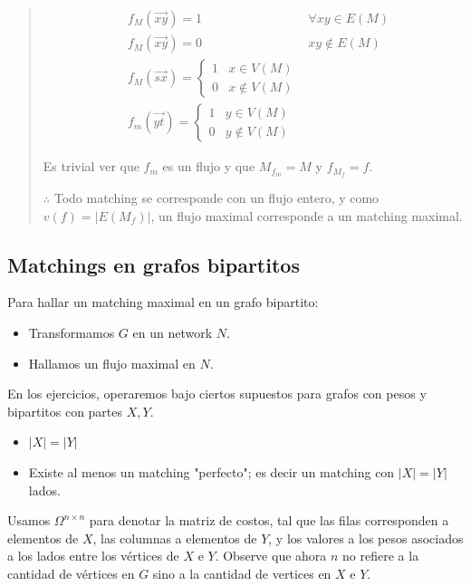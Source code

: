 \documentclass[a4paper]{article}
\begin{document}
\begin{quote}
\begin{align*}
    &f_M(\overrightarrow{xy}) = 1 & \forall xy \in  E(M) \\ 
    &f_M(\overrightarrow{xy}) = 0 & xy \not\in E(M) \\ 
    &f_M(\overrightarrow{sx}) = \begin{cases}
        1 & x \in V(M) \\ 
        0 & x \not\in V(M)
    \end{cases} \\ 
    &f_m(\overrightarrow{yt}) = \begin{cases}
        1 & y \in V(M) \\ 
        0 & y \not\in V(M)
    \end{cases}
\end{align*}

Es trivial ver que $f_m$ es un flujo y que $M_{f_m} = M$ y $f_{M_f} = f$.

$\therefore $ Todo matching se corresponde con un flujo entero, y como $v(f) = |E(M_f)|$, un flujo maximal 
corresponde a un matching maximal.

\end{quote}
\normalsize

\subsection{Matchings en grafos bipartitos}

Para hallar un matching maximal en un grafo bipartito:

\begin{itemize}
    \item Transformamos $G$ en un network $N$.
    \item Hallamos un flujo maximal en $N$.
\end{itemize}

En los ejercicios, operaremos bajo ciertos supuestos para grafos con pesos y
bipartitos con partes $X, Y$.

\begin{itemize}
    \item $|X| = |Y|$
    \item Existe al menos un matching "perfecto"; es decir un matching con $|X| = |Y|$ lados.
\end{itemize}

Usamos $\Omega^{n\times n}$ para denotar la matriz de costos, tal que las filas
corresponden a elementos de $X$, las columnas a elementos de $Y$, y los valores
a los pesos asociados a los lados entre los vértices de $X$ e $Y$. Observe que
ahora $n$ no refiere a la cantidad de vértices en $G$ sino a la cantidad de
vertices en $X$ e $Y$.
\end{document}
